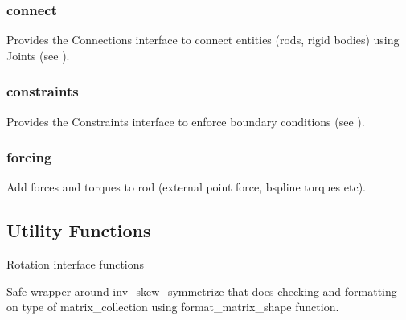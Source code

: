 \documentclass[letterpaper,10pt,english]{sphinxmanual}
\begin{document}
\subsubsection{connect}
\label{\detokenize{documentation:connect}}
Provides the Connections interface to connect entities (rods,
rigid bodies) using Joints (see ).
\label{\detokenize{documentation:module-elastica.wrappers.constraints}}

\subsubsection{constraints}
\label{\detokenize{documentation:constraints}}
Provides the Constraints interface to enforce boundary conditions (see ).
\label{\detokenize{documentation:module-elastica.wrappers.forcing}}

\subsubsection{forcing}
\label{\detokenize{documentation:forcing}}
Add forces and torques to rod (external point force, b\sphinxhyphen{}spline torques etc).


\subsection{Utility Functions}
\label{\detokenize{documentation:module-elastica.transformations}}\label{\detokenize{documentation:utility-functions}}
Rotation interface functions

\begin{fulllineitems}
\label{\detokenize{documentation:elastica.transformations.inv_skew_symmetrize}}
Safe wrapper around inv\_skew\_symmetrize that does checking
and formatting on type of matrix\_collection using format\_matrix\_shape
function.

\end{fulllineitems}
\end{document}
